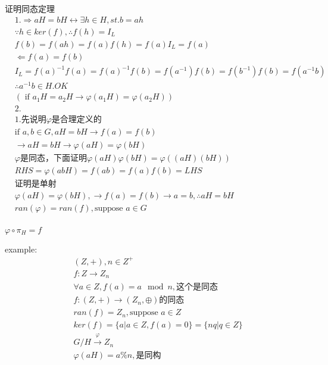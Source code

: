 \documentclass[12pt, a4paper]{article}  %
\begin{document}
证明同态定理
\begin{align}
    &1.\Rightarrow aH=bH\leftrightarrow \exists h\in H,st. b=ah\\
    &\because h\in ker(f),\therefore f(h)=I_L\\
    &f(b)=f(ah)=f(a)f(h)=f(a)I_L=f(a)\\
    &\Leftarrow f(a)=f(b)\\
    &I_L=f(a)^{-1}f(a)=f(a)^{-1}f(b)=f(a^{-1})f(b)=f(b^{-1})f(b)=f(a^{-1}b)\\
    &\therefore a^{-1}b\in H.OK\\
    & (\text{ if }a_1H=a_2H\rightarrow \varphi(a_1H)=\varphi(a_2H))\\
    & 2.\\
    &1.\text{先说明}\varphi \text{是合理定义的}\\
    &\text{if }a,b\in G,aH=bH\rightarrow f(a)=f(b)\\
    & \rightarrow aH=bH\rightarrow \varphi(aH)=\varphi(bH)\\
    &\varphi\text{是同态，下面证明}\varphi(aH)\varphi(bH)=\varphi((aH)(bH))\\
    &RHS=\varphi(abH)=f(ab)=f(a)f(b)=LHS\\
    &\text{证明是单射}\\
    &\varphi(aH)=\varphi(bH),\rightarrow f(a)=f(b)\rightarrow a=b,\therefore aH=bH\\
    &ran(\varphi)=ran(f),\text{suppose }a\in G\\
\end{align}


\(\varphi \circ \pi_H=f\)

example:
\begin{align}
    &(Z,+),n\in Z^{+}\\
    &f:Z\rightarrow Z_n\\
    &\forall a\in Z,f(a)=a\mod n,\text{这个是同态}\\
    &f:(Z,+)\rightarrow (Z_n,\oplus)\text{的同态}\\
    &ran(f)=Z_n,\text{suppose }a\in Z\\
    &ker(f)=\{a|a\in Z,f(a)=0\}=\{nq|q\in Z\}\\
    &G/H\overset{\varphi}{\rightarrow } Z_n\\
    &\varphi(aH)=a\%n,\text{是同构}
\end{align}
\end{document}

